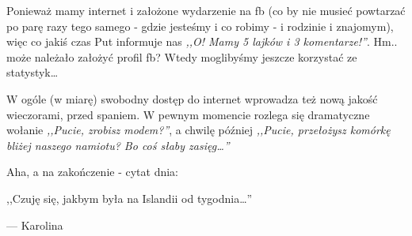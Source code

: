 
Ponieważ mamy internet i założone wydarzenie na fb (co by nie musieć powtarzać po parę razy tego samego - gdzie jesteśmy i co robimy - i rodzinie i znajomym), więc co jakiś czas Put informuje nas \emph{,,O! Mamy 5 lajków i 3 komentarze!''}. Hm.. może należało założyć profil fb? Wtedy moglibyśmy jeszcze korzystać ze statystyk…

W ogóle (w miarę) swobodny dostęp do internet wprowadza też nową jakość wieczorami, przed spaniem. W pewnym momencie rozlega się dramatyczne wołanie \emph{,,Pucie, zrobisz modem?''}, a chwilę później \emph{,,Pucie, przełożysz komórkę bliżej naszego namiotu? Bo coś słaby zasięg…''}

\vspace{16pt}

Aha, a na zakończenie - cytat dnia:
\epigraph{,,Czuję się, jakbym była na Islandii od tygodnia…''}{--- \textup{Karolina}}

